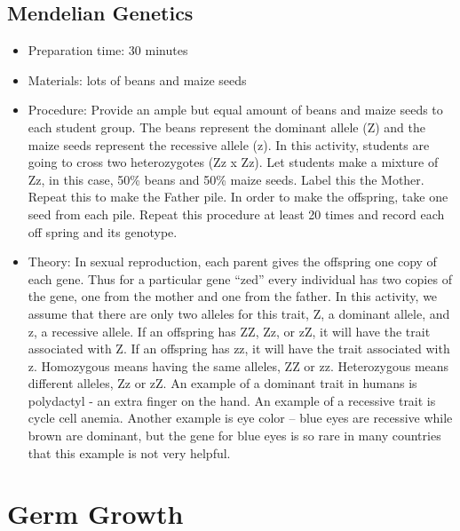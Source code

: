 \subsection{Mendelian Genetics}
\begin{itemize}
\item{Preparation time: 30 minutes}
\item{Materials: lots of beans and maize seeds}
\item{Procedure: Provide an ample but equal amount of beans and maize seeds to each student group. The beans represent the dominant allele (Z) and the maize seeds represent the recessive allele (z). In this activity, students are going to cross two heterozygotes (Zz x Zz). Let students make a mixture of Zz, in this case, 50\% beans and 50\% maize seeds. Label this the Mother. Repeat this to make the Father pile. In order to make the offspring, take one seed from each pile. Repeat this procedure at least 20 times and record each off spring and its genotype.}
\item{Theory: In sexual reproduction, each parent gives the offspring one copy of each gene. Thus for a particular gene “zed” every individual has two copies of the gene, one from the mother and one from the father. In this activity, we assume that there are only two alleles for this trait, Z, a dominant allele, and z, a recessive allele. If an offspring has ZZ, Zz, or zZ, it will have the trait associated with Z. If an offspring has zz, it will have the trait associated with z. Homozygous means having the same alleles, ZZ or zz. Heterozygous means different alleles, Zz or zZ. An example of a dominant trait in humans is polydactyl - an extra finger on the hand. An example of a recessive trait is cycle cell anemia. Another example is eye color – blue eyes are recessive while brown are dominant, but the gene for blue eyes is so rare in many countries that this example is not very helpful.}
\end{itemize}

\section{Germ Growth}
